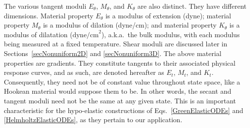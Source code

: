 The various tangent moduli $E_{\theta}$, $M_{\theta}$, and $K_{\theta}$ are also distinct.  They have different dimensions.  Material property $E_{\theta}$ is a modulus of extension (dyne); material property $M_{\theta}$ is a modulus of dilation (dyne/cm); and material property $K_{\theta}$ is a modulus of dilatation ($\text{dyne/cm}^2$), a.k.a.\ the bulk modulus, with each modulus being measured at a fixed temperature.  Shear moduli are discussed later in Sections~\ref{secNonuniform2D} and \ref{secNonuniform3D}.  The above material properties are gradients.  They constitute tangents to their associated physical response curves, and as such, are denoted hereafter as $E_t$, $M_t$, and $K_t$.  Consequently, they need not be of constant value throughout state space, like a Hookean material would suppose them to be.  In other words, the secant and tangent moduli need not be the same at any given state.  This is an important characteristic for the hypo-elastic constructions of Eqs.~\ref{GreenElasticODEs} and \ref{HelmholtzElasticODEs}, as they pertain to our application. 

